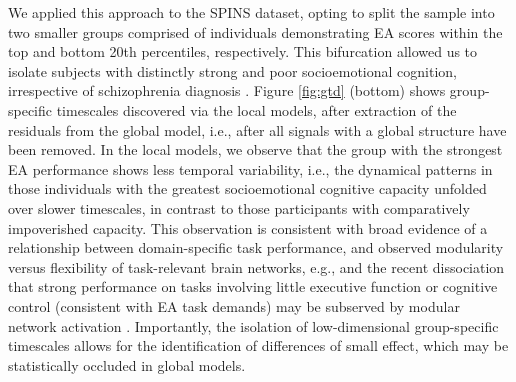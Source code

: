 We applied this approach to the SPINS dataset, opting to split the sample into two smaller groups comprised of individuals demonstrating EA scores within the top and bottom 20th percentiles, respectively. This bifurcation allowed us to isolate subjects with distinctly strong and poor socioemotional cognition, irrespective of schizophrenia diagnosis \cite{insel2014nimh}. Figure \ref{fig:gtd} (bottom) shows group-specific timescales discovered via the local models, after extraction of the residuals from the global model, i.e., after all signals with a global structure have been removed. In the local models, we observe that the group with the strongest EA performance shows less temporal variability, i.e., the dynamical patterns in those individuals with the greatest socioemotional cognitive capacity unfolded over slower timescales, in contrast to those participants with comparatively impoverished capacity. This observation is consistent with broad evidence of a relationship between domain-specific task performance, and observed modularity versus flexibility of task-relevant brain networks, e.g.\cite{olsen2013functional}, and the recent dissociation that strong performance on tasks involving little executive function or cognitive control (consistent with EA task demands) may be subserved by modular network activation \cite{ramos2017static}. Importantly, the isolation of low-dimensional group-specific timescales allows for the identification of differences of small effect, which may be statistically occluded in global models. 




